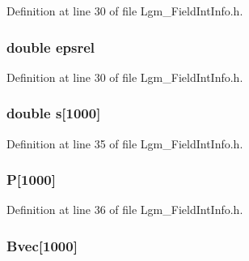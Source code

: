 Definition at line 30 of file Lgm\_\-FieldIntInfo.h.\hypertarget{struct_lgm___field_int_info_15d3900b8e4e4f00f7ae7d806828dd17}{
\subsubsection[{epsrel}]{\setlength{\rightskip}{0pt plus 5cm}double {\bf epsrel}}}
\label{struct_lgm___field_int_info_15d3900b8e4e4f00f7ae7d806828dd17}




Definition at line 30 of file Lgm\_\-FieldIntInfo.h.\hypertarget{struct_lgm___field_int_info_ceb7ba559344361c1beb271fc337896e}{
\subsubsection[{s}]{\setlength{\rightskip}{0pt plus 5cm}double {\bf s}\mbox{[}1000\mbox{]}}}
\label{struct_lgm___field_int_info_ceb7ba559344361c1beb271fc337896e}




Definition at line 35 of file Lgm\_\-FieldIntInfo.h.\hypertarget{struct_lgm___field_int_info_5ba0c6b33b6c0cb721daa1a92f0fdba2}{
\subsubsection[{P}]{ {\bf P}\mbox{[}1000\mbox{]}}}
\label{struct_lgm___field_int_info_5ba0c6b33b6c0cb721daa1a92f0fdba2}




Definition at line 36 of file Lgm\_\-FieldIntInfo.h.\hypertarget{struct_lgm___field_int_info_861cd8f26a851c335b39a0f42a644bd8}{
\subsubsection[{Bvec}]{ {\bf Bvec}\mbox{[}1000\mbox{]}}}
\label{struct_lgm___field_int_info_861cd8f26a851c335b39a0f42a644bd8}




